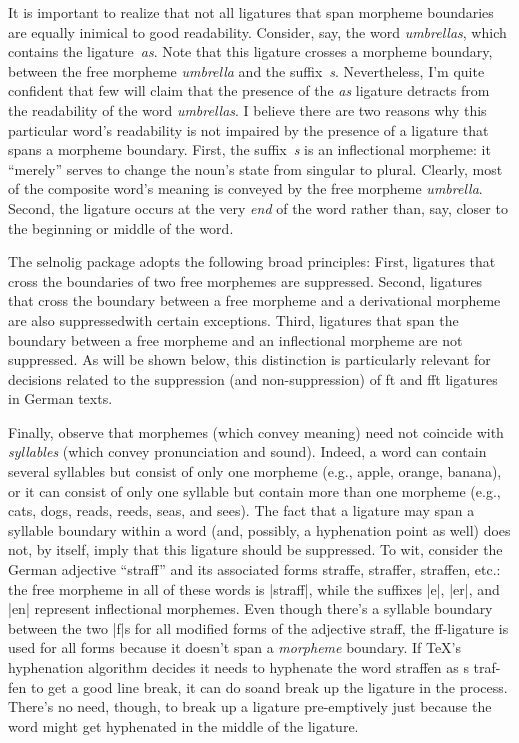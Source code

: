 \documentclass[11pt]{article}
\newcommand{\pkg}[1]{\textsf{#1}}
\begin{document}
It is important to realize that not all ligatures that span morpheme boundaries are equally inimical to good readability. Consider, say, the word \emph{umbrellas}, which contains the ligature~\emph{as}. Note that this ligature crosses a morpheme boundary, between the free morpheme \emph{umbrella} and the suffix~\emph{s}. Nevertheless, I'm quite confident that few will claim that the presence of the \emph{as} ligature detracts from the readability of the word \emph{umbrellas}. I believe there are two reasons why this particular word's readability is not impaired by the presence of a ligature that spans a morpheme boundary. First, the suffix~\emph{s} is an inflectional morpheme: it \enquote{merely} serves to change the noun's state from singular to plural. Clearly, most of the composite word's meaning is conveyed by the free morpheme \emph{umbrella}. Second, the ligature occurs at the very \emph{end} of the word rather than, say, closer to the beginning or middle of the word.

The \pkg{selnolig} package adopts the following broad principles: First, ligatures that cross the boundaries of two free morphemes are suppressed. Second, ligatures that cross the boundary between a free morpheme and a derivational morpheme are also suppressed\textemdash with certain exceptions. Third, ligatures that span the boundary between a free morpheme and an inflectional morpheme are not suppressed. As will be shown below, this distinction is particularly relevant for decisions related to the suppression (and non-suppression) of ft and fft ligatures in German texts.

Finally, observe that morphemes (which convey meaning) need not coincide with \emph{syllables} (which convey pronunciation and sound). Indeed, a word can contain several syllables but consist of only one morpheme (e.g., apple, orange, banana), or it can consist of only one syllable but contain more than one morpheme (e.g., cats, dogs, reads, reeds, seas, and sees). The fact that a ligature may span a syllable boundary within a word (and, possibly, a hyphenation point as well) does not, by itself, imply that this ligature should be suppressed. To wit, consider the German adjective \enquote{straff} and its associated forms straffe, straffer, straffen, etc.: the free morpheme in all of these words is |straff|, while the suffixes |e|, |er|, and |en| represent inflectional morphemes. Even though there's a syllable boundary between the two |f|s for all modified forms of the adjective straff, the ff-ligature is used for all forms because it doesn't span a \emph{morpheme} boundary. If TeX's hyphenation algorithm decides it needs to hyphenate the word straffen as s\kern0pt traf-fen to get a good line break, it can do so\textemdash and break up the ligature in the process. There's no need, though, to break up a ligature pre-emptively just because the word might get hyphenated in the middle of the ligature.
\end{document}
